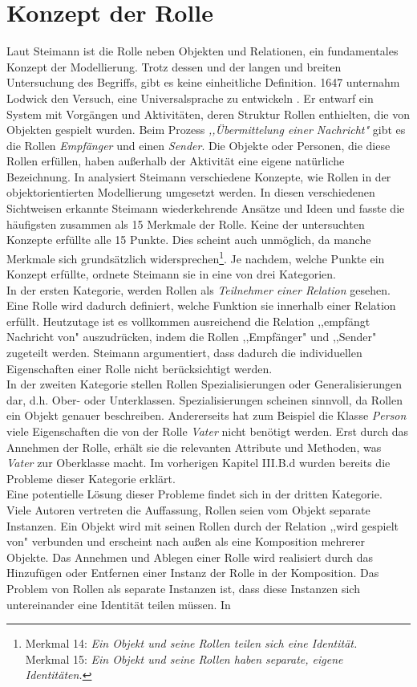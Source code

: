 \documentclass[conference]{IEEEtran}
\begin{document}
\section{Konzept der Rolle}Laut Steimann ist die Rolle neben Objekten und Relationen, ein fundamentales Konzept der Modellierung. Trotz dessen und der langen und breiten Untersuchung des Begriffs, gibt es keine einheitliche Definition. 1647 unternahm Lodwick den Versuch, eine Universalsprache zu entwickeln \cite{hunter2012lodwick}. Er entwarf ein System mit Vorgängen und Aktivitäten, deren Struktur Rollen enthielten, die von Objekten gespielt wurden. Beim Prozess \textit{,,Übermittelung einer Nachricht"} gibt es die Rollen \textit{Empfänger} und einen \textit{Sender}. Die Objekte oder Personen, die diese Rollen erfüllen, haben außerhalb der Aktivität eine eigene natürliche Bezeichnung. In \cite{steimann2000representation} analysiert Steimann verschiedene Konzepte, wie Rollen in der objektorientierten Modellierung umgesetzt werden. In diesen verschiedenen Sichtweisen erkannte Steimann wiederkehrende Ansätze und Ideen und fasste die häufigsten zusammen als 15 Merkmale der Rolle. Keine der untersuchten Konzepte erfüllte alle 15 Punkte. Dies scheint auch unmöglich, da manche Merkmale sich grundsätzlich widersprechen\footnote { Merkmal 14: \textit{Ein Objekt und seine Rollen teilen sich eine Identität.} \\Merkmal 15: \textit{Ein Objekt und seine Rollen haben separate, eigene Identitäten.}}. Je nachdem, welche Punkte ein Konzept erfüllte, ordnete Steimann sie in eine von drei Kategorien. \\ In der ersten Kategorie, werden Rollen als \textit{Teilnehmer einer Relation} gesehen. Eine Rolle wird dadurch definiert, welche Funktion sie innerhalb einer Relation erfüllt. Heutzutage ist es vollkommen ausreichend die Relation ,,empfängt Nachricht von" auszudrücken, indem die Rollen ,,Empfänger" und ,,Sender" zugeteilt werden. Steimann argumentiert, dass dadurch die individuellen Eigenschaften einer Rolle nicht berücksichtigt werden.\\ In der zweiten Kategorie stellen Rollen Spezialisierungen oder Generalisierungen dar, d.h. Ober- oder Unterklassen. Spezialisierungen scheinen sinnvoll, da Rollen ein Objekt genauer beschreiben. Andererseits hat zum Beispiel die Klasse \textit{Person} viele Eigenschaften die von der Rolle \textit{Vater} nicht benötigt werden. Erst durch das Annehmen der Rolle, erhält sie die relevanten Attribute und Methoden, was \textit{Vater} zur Oberklasse macht. Im vorherigen Kapitel III.B.d wurden bereits die Probleme dieser Kategorie erklärt.\\ Eine potentielle Lösung dieser Probleme findet sich in der dritten Kategorie. Viele Autoren vertreten die Auffassung, Rollen seien vom Objekt separate Instanzen. Ein Objekt wird mit seinen Rollen durch der Relation ,,wird gespielt von" verbunden und erscheint nach außen als eine Komposition mehrerer Objekte. Das Annehmen und Ablegen einer Rolle wird realisiert durch das Hinzufügen oder Entfernen einer Instanz der Rolle in der Komposition. Das Problem von Rollen als separate Instanzen ist, dass diese Instanzen sich untereinander eine Identität teilen müssen. In 
\end{document}
